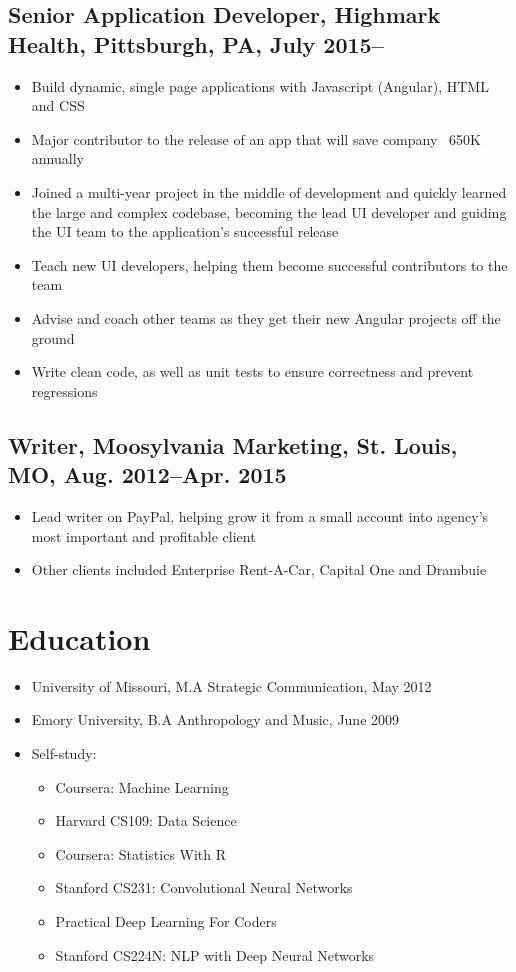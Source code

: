 \documentclass[10pt]{article}
\begin{document}
		\subsection{\normalsize{Senior Application Developer, Highmark Health, Pittsburgh, PA, July 2015--}}
		\begin{itemize}[noitemsep]
		\item Build dynamic, single page applications with Javascript (Angular), HTML and CSS
		\item Major contributor to the release of an app that will save company ~650K annually
		\item Joined a multi-year project in the middle of development and quickly learned the large and complex codebase, becoming the lead UI developer and guiding the UI team to the application's successful release
		\item Teach new UI developers, helping them become successful contributors to the team
		\item Advise and coach other teams as they get their new Angular projects off the ground
		\item Write clean code, as well as unit tests to ensure correctness and prevent regressions
		\end{itemize}
		
	\subsection{\normalsize{Writer, Moosylvania Marketing, St. Louis, MO, Aug. 2012--Apr. 2015}}
	\begin{itemize}[noitemsep]
		\item Lead writer on PayPal, helping grow it from a small account into agency’s most important and profitable client
		\item Other clients included Enterprise Rent-A-Car, Capital One and Drambuie
	\end{itemize}
	
	\section{Education}
		\begin{itemize}[noitemsep]
			\item University of Missouri, M.A Strategic Communication, May 2012
			\item Emory University, B.A Anthropology and Music, June 2009
			\item Self-study:
				\begin{itemize}[noitemsep]
						\item Coursera: Machine Learning 
						\item Harvard CS109: Data Science
						\item Coursera: Statistics With R 
						\item Stanford CS231: Convolutional Neural Networks
						\item Practical Deep Learning For Coders 
						\item Stanford CS224N: NLP with Deep Neural Networks
				\end{itemize}
					
				
		\end{itemize}
	
\end{document}
